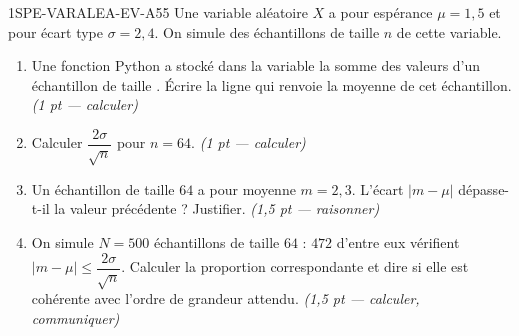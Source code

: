\begin{evaluation}{1SPE-VARALEA-EV-A}{55}
\medskip
Une variable aléatoire $X$ a pour espérance $\mu = 1{,}5$ et pour écart type
$\sigma = 2{,}4$. On simule des échantillons de taille $n$ de cette variable.

\begin{enumerate}
  \item Une fonction Python a stocké dans la variable  la somme
        des valeurs d'un échantillon de taille . Écrire la ligne qui
        renvoie la moyenne de cet échantillon.
  \hfill\textit{(1 pt — calculer)}

  \item Calculer $\dfrac{2\sigma}{\sqrt{n}}$ pour $n = 64$.
  \hfill\textit{(1 pt — calculer)}

  \item Un échantillon de taille $64$ a pour moyenne $m = 2{,}3$.
        L'écart $|m - \mu|$ dépasse-t-il la valeur précédente ? Justifier.
  \hfill\textit{(1{,}5 pt — raisonner)}

  \item On simule $N = 500$ échantillons de taille $64$ : $472$ d'entre eux
        vérifient $|m - \mu| \leq \dfrac{2\sigma}{\sqrt{n}}$. Calculer la
        proportion correspondante et dire si elle est cohérente avec l'ordre
        de grandeur attendu.
  \hfill\textit{(1{,}5 pt — calculer, communiquer)}
\end{enumerate}

\end{evaluation}
